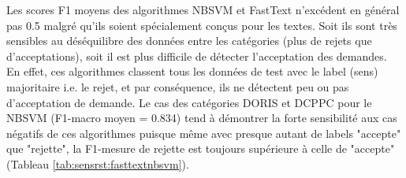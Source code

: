  Les scores F1 moyens des algorithmes  NBSVM et FastText n'excédent en général pas 0.5 malgré qu'ils soient spécialement conçus pour les textes.  Soit ils sont très sensibles au déséquilibre des données entre les catégories (plus de rejets que d'acceptations), soit il est plus difficile de détecter l'acceptation des demandes. En effet, ces algorithmes classent tous les données de test avec le label (sens) majoritaire i.e. le rejet, et par conséquence, ils ne détectent peu ou pas d'acceptation de demande. Le cas des catégories DORIS et DCPPC pour le NBSVM (F1-macro moyen = 0.834) tend à démontrer la forte sensibilité aux cas négatifs de ces algorithmes puisque même avec presque autant de labels "accepte" que "rejette", la F1-mesure de rejette est toujours supérieure à celle de "accepte" (Tableau \ref{tab:sensrst:fasttextnbsvm}). 
 
